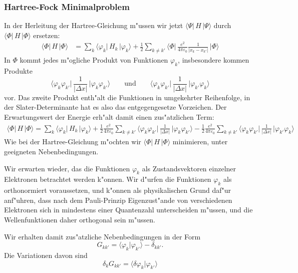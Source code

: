 \subsubsection{Hartree-Fock Minimalproblem}
In der Herleitung der Hartree-Gleichung m"ussen wir jetzt
$\langle\Psi|\,H\,|\Psi\rangle$ 
durch
$\langle\Phi|\,H\,|\Phi\rangle$ 
ersetzen:
\begin{align*}
\langle\Phi|\,H\,|\Phi\rangle
&=
\sum_k\langle\varphi_k|\,H_k\,|\varphi_k\rangle
+
\frac12
\sum_{k\ne k'}\biggl\langle\Phi\biggl|\,
\frac{e^2}{4\pi\varepsilon_0}
\frac{1}{|x_k-x_{k'}|}
\,\biggr|\Phi\biggr\rangle
\end{align*}
In $\Phi$ kommt jedes m"ogliche Produkt von Funktionen $\varphi_k$,
insbesondere kommen Produkte
\[
\biggl\langle\varphi_k\varphi_{k'}\biggr|\,
\frac{1}{|\Delta x|}
\,\biggl|\varphi_k\varphi_{k'}\biggr\rangle
\qquad\text{und}\qquad
\biggl\langle\varphi_k\varphi_{k'}\biggr|\,
\frac{1}{|\Delta x|}
\,\biggl|\varphi_{k'}\varphi_k\biggr\rangle
\]
vor.
Das zweite Produkt enth"alt die Funktionen in umgekehrter Reihenfolge,
in der Slater-Deter\-minante hat es also das entgegengesetze Vorzeichen.
Der Erwartungswert der Energie erh"alt damit einen zus"atzlichen Term:
\begin{align*}
\langle\Phi|\,H\,|\Phi\rangle
=
\sum_k\langle\varphi_k|\,H_k\,|\varphi_k\rangle
+
\frac12
\frac{e^2}{4\pi\varepsilon_0}
\sum_{k\ne k'}
\biggl\langle\varphi_k\varphi_{k'}\biggr|\,
\frac{1}{|\Delta x|}
\,\biggl|\varphi_k\varphi_{k'}\biggr\rangle
-
\frac12
\frac{e^2}{4\pi\varepsilon_0}
\sum_{k\ne k'}
\biggl\langle\varphi_k\varphi_{k'}\biggr|\,
\frac{1}{|\Delta x|}
\,\biggl|\varphi_{k'}\varphi_k\biggr\rangle
\end{align*}
Wie bei der Hartree-Gleichung m"ochten wir
$\langle\Phi|\,H\,|\Phi\rangle$ 
minimieren, unter geeigneten Nebenbedingungen.

Wir erwarten wieder, das die Funktionen $\varphi_k$ als Zustandsvektoren
einzelner Elektronen betrachtet werden k"onnen.
Wir d"urfen die Funktionen $\varphi_k$ als orthonormiert voraussetzen,
und k"onnen als physikalischen Grund daf"ur anf"uhren, dass
nach dem Pauli-Prinzip Eigenzust"ande
von verschiedenen Elektronen sich in mindestens einer Quantenzahl
unterscheiden m"ussen, und die Wellenfunktionen daher orthogonal
sein m"ussen.

Wir erhalten damit zus"atzliche Nebenbedingungen in der Form
\[
G_{kk'}=\langle\varphi_k|\varphi_{k'}\rangle-\delta_{kk'}.
\]
Die Variationen davon sind
\[
\delta_k G_{kk'}
=
\langle\delta\varphi_k |\varphi_{k'}\rangle
\]
